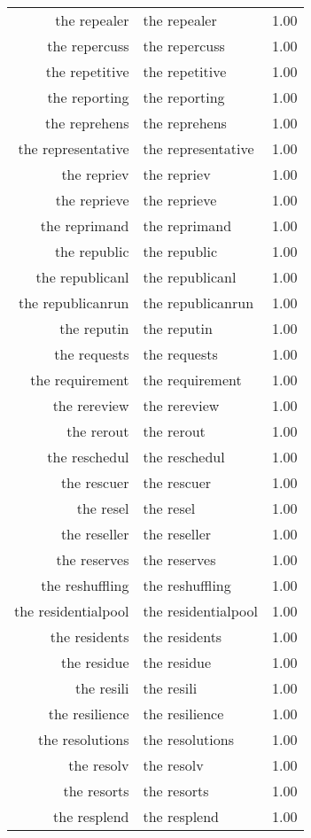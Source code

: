 \begin{table}[ht]
\begin{tabular}{rlr}
  the repealer & the repealer & 1.00 \\ 
  the repercuss & the repercuss & 1.00 \\ 
  the repetitive & the repetitive & 1.00 \\ 
  the reporting & the reporting & 1.00 \\ 
  the reprehens & the reprehens & 1.00 \\ 
  the representative & the representative & 1.00 \\ 
  the repriev & the repriev & 1.00 \\ 
  the reprieve & the reprieve & 1.00 \\ 
  the reprimand & the reprimand & 1.00 \\ 
  the republic & the republic & 1.00 \\ 
  the republicanl & the republicanl & 1.00 \\ 
  the republicanrun & the republicanrun & 1.00 \\ 
  the reputin & the reputin & 1.00 \\ 
  the requests & the requests & 1.00 \\ 
  the requirement & the requirement & 1.00 \\ 
  the rereview & the rereview & 1.00 \\ 
  the rerout & the rerout & 1.00 \\ 
  the reschedul & the reschedul & 1.00 \\ 
  the rescuer & the rescuer & 1.00 \\ 
  the resel & the resel & 1.00 \\ 
  the reseller & the reseller & 1.00 \\ 
  the reserves & the reserves & 1.00 \\ 
  the reshuffling & the reshuffling & 1.00 \\ 
  the residentialpool & the residentialpool & 1.00 \\ 
  the residents & the residents & 1.00 \\ 
  the residue & the residue & 1.00 \\ 
  the resili & the resili & 1.00 \\ 
  the resilience & the resilience & 1.00 \\ 
  the resolutions & the resolutions & 1.00 \\ 
  the resolv & the resolv & 1.00 \\ 
  the resorts & the resorts & 1.00 \\ 
  the resplend & the resplend & 1.00 \\ 

\end{tabular}
\end{table}
